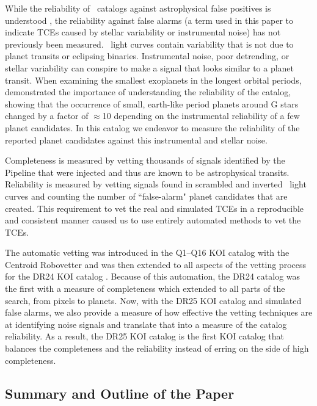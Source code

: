 While the reliability of \Kepler\ catalogs against astrophysical false positives is understood \citep[see e.g.][]{Morton2016}, the reliability against false alarms (a term used in this paper to indicate TCEs caused by stellar variability or instrumental noise) has not previously been measured.  \Kepler\ light curves contain variability that is not due to planet transits or eclipsing binaries.  Instrumental noise, poor detrending, or stellar variability can conspire to make a signal that looks similar to a planet transit. When examining the smallest exoplanets in the longest orbital periods, \citet{Burke2015} demonstrated the importance of understanding the reliability of the catalog, showing that the occurrence of small, earth-like period planets around G stars changed by a factor of $\approx$10 depending on the instrumental reliability of a few planet candidates.  In this catalog we endeavor to measure the reliability of the reported planet candidates against this instrumental and stellar noise.  


Completeness is measured by vetting thousands of signals identified by the \Kepler Pipeline that were injected and thus are known to be astrophysical transits. Reliability is measured by vetting signals found in scrambled and inverted \Kepler\ light curves and counting the number of ``false-alarm" planet candidates that are created. This requirement to vet the real and simulated TCEs in a reproducible and consistent manner caused us to use entirely automated methods to vet the TCEs.  

The automatic vetting was introduced in the Q1--Q16 KOI catalog \citep{Mullally2015cat} with the Centroid Robovetter and was then extended to all aspects of the vetting process for the DR24 KOI catalog \citep{Coughlin2016}. Because of this automation, the DR24 catalog was the first with a measure of completeness which extended to all parts of the search, from pixels to planets.  Now, with the DR25 KOI catalog and simulated false alarms, we also provide a measure of how effective the vetting techniques are at identifying noise signals and translate that into a measure of the catalog reliability. As a result, the DR25 KOI catalog is the first KOI catalog that balances the completeness and the reliability instead of erring on the side of high completeness. 

\subsection{Summary and Outline of the Paper}

